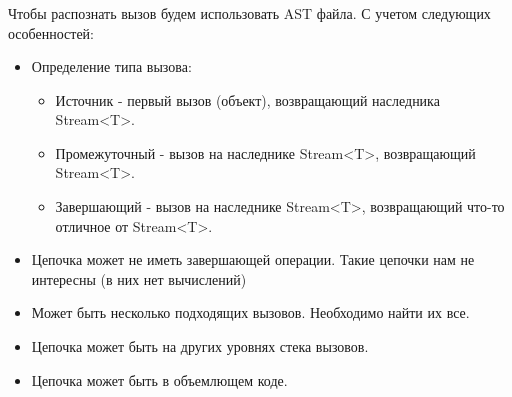 \begin{frame}[noframenumbering]
\frametitle{\insertsection} 
\framesubtitle{\insertsubsection}
Чтобы распознать вызов будем использовать AST файла.
С учетом следующих особенностей:
\begin{itemize}
	\item Определение типа вызова: 
	\begin{itemize}
		\item Источник - первый вызов (объект), возвращающий наследника Stream<T>.
		\item Промежуточный - вызов на наследнике Stream<T>, возвращающий Stream<T>.
		\item Завершающий - вызов на наследнике Stream<T>, возвращающий что-то отличное от Stream<T>.
	\end{itemize}
	\item Цепочка может не иметь завершающей операции. Такие цепочки нам не интересны (в них нет вычислений)
	\item Может быть несколько подходящих вызовов. Необходимо найти их все.
	\item Цепочка может быть на других уровнях стека вызовов.
	\item Цепочка может быть в объемлющем коде.
\end{itemize}
\end{frame}
